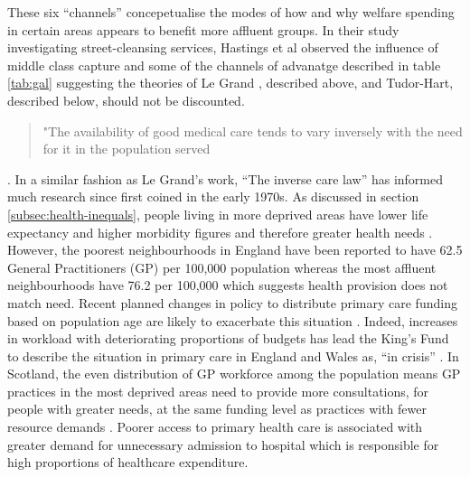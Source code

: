 \documentclass[12pt,]{report}
\begin{document}
\begin{table}[h]
{
}
\end{table}

These six ``channels'' concepetualise the modes of how and why welfare
spending in certain areas appears to benefit more affluent groups. In
their study investigating street-cleansing services, Hastings et al
\citeyearpar{RN116} observed the influence of middle class capture and
some of the channels of advanatge described in table \ref{tab:gal}
suggesting the theories of Le Grand \citeyearpar{RN175}, described
above, and Tudor-Hart, described below, should not be discounted.

\begin{quote} "The availability of good medical care tends to vary inversely with the need for it in the population served\end{quote}

\citep{RN120}. In a similar fashion as Le Grand's work, ``The inverse
care law'' has informed much research since first coined in the early
1970s. As discussed in section \ref{subsec:health-inequals}, people
living in more deprived areas have lower life expectancy and higher
morbidity figures and therefore greater health needs \citep{RN37}.
However, the poorest neighbourhoods in England have been reported to
have 62.5 General Practitioners (GP) per 100,000 population whereas the
most affluent neighbourhoods have 76.2 per 100,000 \citep{RN317} which
suggests health provision does not match need. Recent planned changes in
policy to distribute primary care funding based on population age are
likely to exacerbate this situation \citep{RN39}. Indeed, increases in
workload with deteriorating proportions of budgets has lead the King's
Fund to describe the situation in primary care in England and Wales as,
``in crisis'' \citep[pp.3]{RN318}. In Scotland, the even distribution of
GP workforce among the population means GP practices in the most
deprived areas need to provide more consultations, for people with
greater needs, at the same funding level as practices with fewer
resource demands \citep{RN148, RN27}. Poorer access to primary health
care is associated with greater demand for unnecessary admission to
hospital \citep{RN49, RN268} which is responsible for high proportions
of healthcare expenditure.
\end{document}
